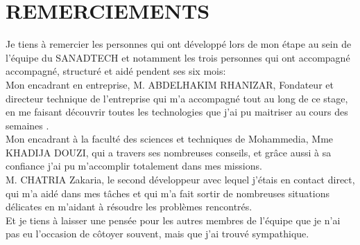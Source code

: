 \documentclass[11pt, oneside]{Thesis} %
\begin{document}
\clearpage %



\clearpage %

\clearpage %
\chapter*{REMERCIEMENTS}


Je tiens à remercier les personnes qui ont développé lors de mon étape au sein de l'équipe du SANADTECH et notamment les trois personnes qui ont accompagné accompagné, structuré et aidé pendent ses six mois:\\[0.5cm]
Mon encadrant en entreprise, M. ABDELHAKIM RHANIZAR, Fondateur et directeur technique de l'entreprise qui m'a accompagné tout au long de ce stage, en me faisant découvrir toutes les technologies que j'ai pu maitriser au cours des semaines . \\
Mon encadrant à la faculté des sciences et techniques de Mohammedia, Mme KHADIJA DOUZI, qui a travers ses nombreuses conseils, et grâce aussi à sa confiance j'ai pu m'accomplir totalement dans mes missions.\\
M. CHATRIA Zakaria, le second développeur avec lequel j'étais en contact direct, qui m'a aidé dans mes tâches et qui m'a fait sortir de nombreuses situations délicates en m'aidant à résoudre les problèmes rencontrés.\\[0.2cm]
Et je tiens à laisser une pensée pour les autres membres de l’équipe que je n’ai pas eu l’occasion de côtoyer souvent, mais que j’ai trouvé sympathique.



%

\clearpage %


\clearpage %
\end{document}
